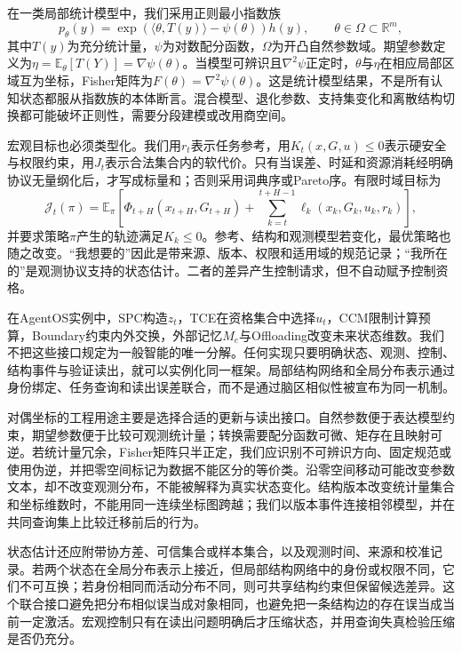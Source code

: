 在一类局部统计模型中，我们采用正则最小指数族
\begin{equation}
p_\theta(y)=\exp\!\left(\langle\theta,T(y)\rangle-\psi(\theta)\right)h(y),\qquad \theta\in\Omega\subset\mathbb R^m,
\end{equation}
其中$T(y)$为充分统计量，$\psi$为对数配分函数，$\Omega$为开凸自然参数域。期望参数定义为$\eta=\mathbb E_\theta[T(Y)]=\nabla\psi(\theta)$。当模型可辨识且$\nabla^2\psi$正定时，$\theta$与$\eta$在相应局部区域互为坐标，Fisher矩阵为$F(\theta)=\nabla^2\psi(\theta)$。这是统计模型结果，不是所有认知状态都服从指数族的本体断言。混合模型、退化参数、支持集变化和离散结构切换都可能破坏正则性，需要分段建模或改用商空间。

宏观目标也必须类型化。我们用$r_t$表示任务参考，用$K_t(x,G,u)\le0$表示硬安全与权限约束，用$J_t$表示合法集合内的软代价。只有当误差、时延和资源消耗经明确协议无量纲化后，才写成标量和；否则采用词典序或Pareto序。有限时域目标为
\begin{equation}
\mathcal J_t(\pi)=\mathbb E_\pi\!\left[\Phi_{t+H}(x_{t+H},G_{t+H})+\sum_{k=t}^{t+H-1}\ell_k(x_k,G_k,u_k,r_k)\right],
\end{equation}
并要求策略$\pi$产生的轨迹满足$K_k\le0$。参考、结构和观测模型若变化，最优策略也随之改变。“我想要的”因此是带来源、版本、权限和适用域的规范记录；“我所在的”是观测协议支持的状态估计。二者的差异产生控制请求，但不自动赋予控制资格。

在AgentOS实例中，SPC构造$z_t$，TCE在资格集合中选择$u_t$，CCM限制计算预算，Boundary约束内外交换，外部记忆$M_e$与Offloading改变未来状态维数。我们不把这些接口规定为一般智能的唯一分解。任何实现只要明确状态、观测、控制、结构事件与验证读出，就可以实例化同一框架。局部结构网络和全局分布表示通过身份绑定、任务查询和读出误差联合，而不是通过脑区相似性被宣布为同一机制。

对偶坐标的工程用途主要是选择合适的更新与读出接口。自然参数便于表达模型约束，期望参数便于比较可观测统计量；转换需要配分函数可微、矩存在且映射可逆。若统计量冗余，Fisher矩阵只半正定，我们应识别不可辨识方向、固定规范或使用伪逆，并把零空间标记为数据不能区分的等价类。沿零空间移动可能改变参数文本，却不改变观测分布，不能被解释为真实状态变化。结构版本改变统计量集合和坐标维数时，不能用同一连续坐标图跨越；我们以版本事件连接相邻模型，并在共同查询集上比较迁移前后的行为。

状态估计还应附带协方差、可信集合或样本集合，以及观测时间、来源和校准记录。若两个状态在全局分布表示上接近，但局部结构网络中的身份或权限不同，它们不可互换；若身份相同而活动分布不同，则可共享结构约束但保留候选差异。这个联合接口避免把分布相似误当成对象相同，也避免把一条结构边的存在误当成当前一定激活。宏观控制只有在读出问题明确后才压缩状态，并用查询失真检验压缩是否仍充分。

